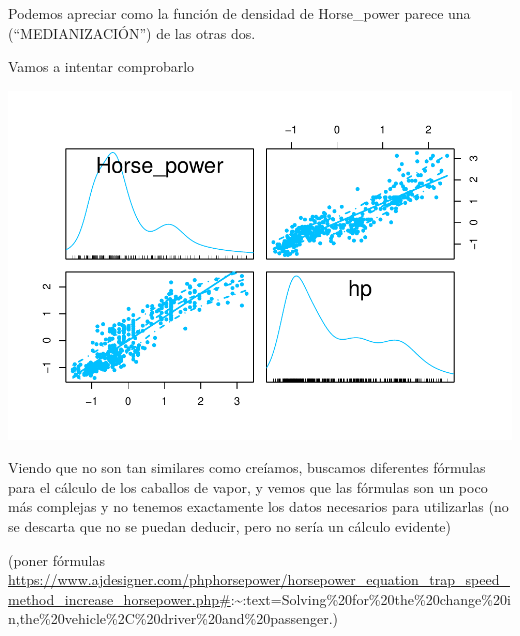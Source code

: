 \documentclass[
]{article}
\newenvironment{Shaded}{\begin{snugshade}}{\end{snugshade}}
\newcommand{\DataTypeTok}[1]{\textcolor[rgb]{0.13,0.29,0.53}{#1}}
\newcommand{\DecValTok}[1]{\textcolor[rgb]{0.00,0.00,0.81}{#1}}
\newcommand{\KeywordTok}[1]{\textcolor[rgb]{0.13,0.29,0.53}{\textbf{#1}}}
\newcommand{\NormalTok}[1]{#1}
\newcommand{\OperatorTok}[1]{\textcolor[rgb]{0.81,0.36,0.00}{\textbf{#1}}}
\newcommand{\StringTok}[1]{\textcolor[rgb]{0.31,0.60,0.02}{#1}}
\begin{document}
Podemos apreciar como la función de densidad de Horse\_power parece una
(``MEDIANIZACIÓN'') de las otras dos.

Vamos a intentar comprobarlo

\begin{Shaded}
\end{Shaded}

\begin{center}\includegraphics{EDA_files/figure-latex/unnamed-chunk-25-1} \end{center}

Viendo que no son tan similares como creíamos, buscamos diferentes
fórmulas para el cálculo de los caballos de vapor, y vemos que las
fórmulas son un poco más complejas y no tenemos exactamente los datos
necesarios para utilizarlas (no se descarta que no se puedan deducir,
pero no sería un cálculo evidente)

(poner fórmulas
\url{https://www.ajdesigner.com/phphorsepower/horsepower_equation_trap_speed_method_increase_horsepower.php\#}:\textasciitilde:text=Solving\%20for\%20the\%20change\%20in,the\%20vehicle\%2C\%20driver\%20and\%20passenger.)
\end{document}
